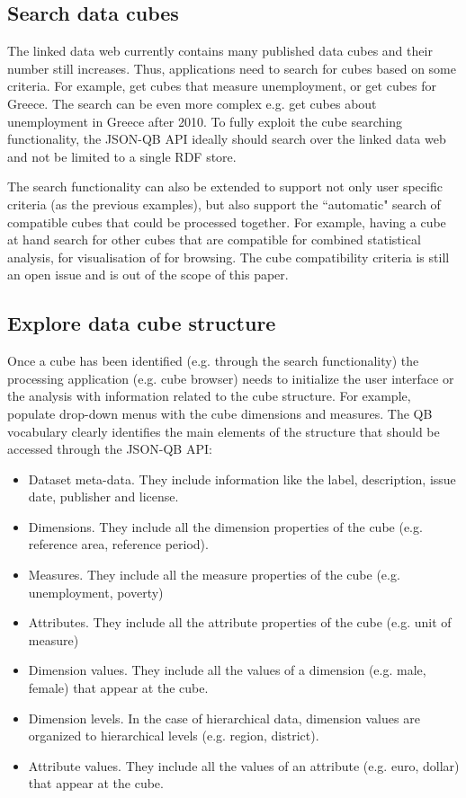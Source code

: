 \documentclass{llncs}
\begin{document}
\subsection{Search data cubes}\label{sec:search}

The linked data web currently contains many published data cubes and their number still increases. Thus, applications need to search for cubes based on some criteria. For example, get cubes that measure unemployment, or get cubes for Greece. The search can be even more complex e.g. get cubes about unemployment in Greece after 2010. To fully exploit the cube searching functionality, the JSON-QB API ideally should search over the linked data web and not be limited to a single RDF store.

The search functionality can also be extended to support not only user specific criteria (as the previous examples), but also support the ``automatic" search of compatible cubes that could be processed together. For example, having a cube at hand search for other cubes that are compatible for combined statistical analysis, for visualisation of for browsing. The cube compatibility criteria is still an open issue and is out of the scope of this paper. 

\subsection{Explore data cube structure}

Once a cube has been identified (e.g. through the search functionality) the processing application (e.g. cube browser) needs to initialize the user interface or the analysis with information related to the cube structure. For example, populate drop-down menus with the cube dimensions and measures. The QB vocabulary clearly identifies the main elements of the structure that should be accessed through the JSON-QB API:
\begin{itemize}
\item Dataset meta-data. They include information like the label, description, issue date, publisher and license.
\item Dimensions. They include all the dimension properties of the cube (e.g. reference area, reference period).
\item Measures. They include all the measure properties of the cube (e.g. unemployment, poverty)
\item Attributes. They include all the attribute properties of the cube (e.g. unit of measure)
\item Dimension values. They include all the values of a dimension (e.g. male, female) that appear at the cube. 
\item Dimension levels. In the case of hierarchical data, dimension values are organized to hierarchical levels (e.g. region, district).
\item Attribute values. They include all the values of an attribute (e.g. euro, dollar) that appear at the cube. 
\end{itemize} 
\end{document}
